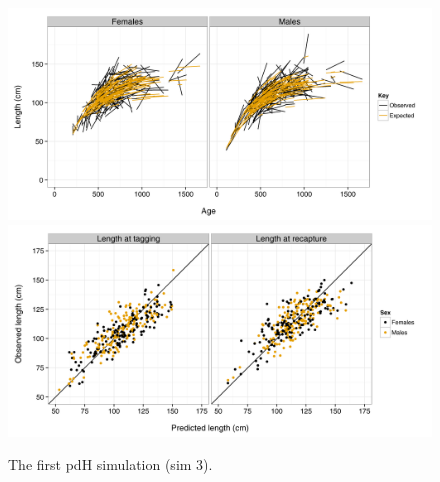 \documentclass[11pt, a4paper]{article}
\begin{document}
\begin{figure}[!htbp]
  \centering
  \includegraphics[width=\linewidth]{../simulation/sims2/results/IndivGrowth_3.png}
  \includegraphics[width=\linewidth]{../simulation/sims2/results/ObsVsPred_3.png}
  \begin{quote}
    \caption{The first pdH simulation (sim 3).}
  \label{fig:}
  \end{quote}
\end{figure}




%
%

\end{document}
